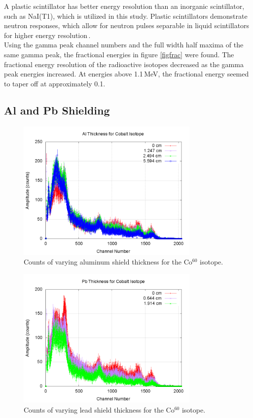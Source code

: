 \documentclass[aps,prl,twocolumn,superscriptaddress,nofootinbib]{revtex4-1}
\begin{document}
A plastic scintillator has better energy resolution than an inorganic scintillator, such as NaI(T1), which is utilized in this study. Plastic scintillators demonstrate neutron responses, which allow for neutron pulses separable in liquid scintillators for higher energy resolution\,\cite{8}.
\\
\indent Using the gamma peak channel numbers and the full width half maxima of the same gamma peak, the fractional energies in figure \ref{figfrac} were found. The fractional energy resolution of the radioactive isotopes decreased as the gamma peak energies increased. At energies above 1.1\,MeV, the fractional energy seemed to taper off at approximately 0.1.
\vfill\eject
\subsection{Al and Pb Shielding}

\begin{figure}[h!]
  \begin{center}
\centerline{\includegraphics[width=3.5in]{cothickal.png}}
\caption{ \small{Counts of varying aluminum shield thickness for the Co$^{60}$ isotope. \label{fig7}}}
  \end{center}
\end{figure}

\begin{figure}[h!]
  \begin{center}
\centerline{\includegraphics[width=3.5in]{cothickpb.png}}
\caption{ \small{Counts of varying lead shield thickness for the Co$^{60}$ isotope. \label{fig8}}}
  \end{center}
\end{figure}
\end{document}
